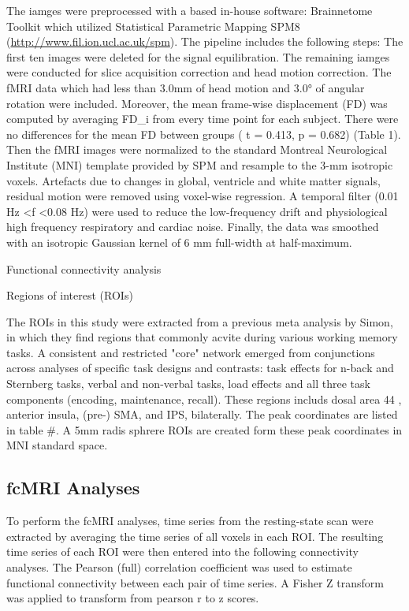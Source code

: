 \documentclass[preprint,authoryear,review,12pt,times]{elsarticle}
\begin{document}

The iamges were preprocessed with a based in-house software: Brainnetome Toolkit which utilized Statistical Parametric Mapping SPM8 (\url{http://www.fil.ion.ucl.ac.uk/spm}). The pipeline includes the following steps: The first ten images were deleted for the signal equilibration. The remaining iamges were conducted for slice acquisition correction and head motion correction.  The fMRI data which had
less than 3.0mm of head motion and 3.0° of angular rotation were included.  Moreover, the mean frame-wise displacement (FD) was computed by averaging FD\_i from every time point for each subject. There were no differences for the mean FD between groups ( t = 0.413, p = 0.682) (Table 1). Then the fMRI images were normalized to the standard Montreal Neurological Institute (MNI) template provided by SPM and resample to the 3-mm isotropic voxels. Artefacts due to changes in global, ventricle and white matter signals, residual motion were removed using voxel-wise regression. A temporal filter (0.01 Hz \textless f \textless 0.08 Hz) were used to reduce the low-frequency drift and physiological high frequency respiratory and cardiac noise. Finally, the data was smoothed with an isotropic Gaussian kernel of 6 mm full-width at half-maximum. 

Functional connectivity analysis

Regions of interest (ROIs)

The ROIs in this study were extracted from a previous meta analysis by Simon, in which they find regions that commonly acvite during various working memory tasks. A consistent and restricted "core" network emerged from conjunctions across analyses of specific task designs and contrasts: task effects for n-back and Sternberg tasks, verbal and non-verbal tasks, load effects and all three task components (encoding, maintenance, recall). These regions includs dosal area 44 , anterior insula, (pre-) SMA, and IPS, bilaterally. The peak coordinates are listed in table \#. A 5mm radis sphrere ROIs are created form these peak coordinates in MNI standard space.

\subsection*{fcMRI Analyses}

To perform the fcMRI analyses, time series from the resting-state scan were extracted by averaging the time series of all voxels in each ROI. The resulting time series of each ROI were then entered into the following connectivity analyses. The Pearson (full) correlation coefficient was used to estimate functional connectivity between each pair of time series. A Fisher Z transform was applied to transform from pearson r to z scores.
\end{document}
